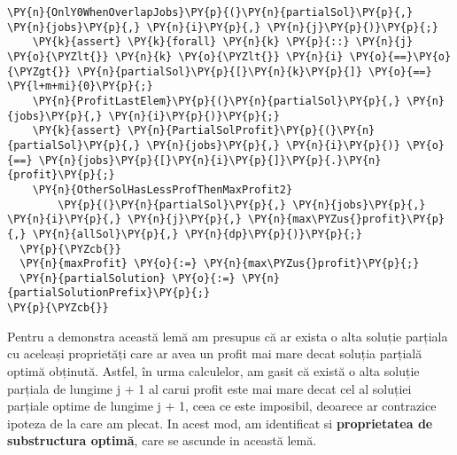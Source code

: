 \begin{Verbatim}[commandchars=\\\{\}, fontsize=\small]
    \PY{n}{OnlY0WhenOverlapJobs}\PY{p}{(}\PY{n}{partialSol}\PY{p}{,} \PY{n}{jobs}\PY{p}{,} \PY{n}{i}\PY{p}{,} \PY{n}{j}\PY{p}{)}\PY{p}{;} 
    \PY{k}{assert} \PY{k}{forall} \PY{n}{k} \PY{p}{::} \PY{n}{j} \PY{o}{\PYZlt{}} \PY{n}{k} \PY{o}{\PYZlt{}} \PY{n}{i} \PY{o}{==}\PY{o}{\PYZgt{}} \PY{n}{partialSol}\PY{p}{[}\PY{n}{k}\PY{p}{]} \PY{o}{==} \PY{l+m+mi}{0}\PY{p}{;}
    \PY{n}{ProfitLastElem}\PY{p}{(}\PY{n}{partialSol}\PY{p}{,} \PY{n}{jobs}\PY{p}{,} \PY{n}{i}\PY{p}{)}\PY{p}{;}
    \PY{k}{assert} \PY{n}{PartialSolProfit}\PY{p}{(}\PY{n}{partialSol}\PY{p}{,} \PY{n}{jobs}\PY{p}{,} \PY{n}{i}\PY{p}{)} \PY{o}{==} \PY{n}{jobs}\PY{p}{[}\PY{n}{i}\PY{p}{]}\PY{p}{.}\PY{n}{profit}\PY{p}{;}
    \PY{n}{OtherSolHasLessProfThenMaxProfit2}
        \PY{p}{(}\PY{n}{partialSol}\PY{p}{,} \PY{n}{jobs}\PY{p}{,} \PY{n}{i}\PY{p}{,} \PY{n}{j}\PY{p}{,} \PY{n}{max\PYZus{}profit}\PY{p}{,} \PY{n}{allSol}\PY{p}{,} \PY{n}{dp}\PY{p}{)}\PY{p}{;}
  \PY{p}{\PYZcb{}}
  \PY{n}{maxProfit} \PY{o}{:=} \PY{n}{max\PYZus{}profit}\PY{p}{;}
  \PY{n}{partialSolution} \PY{o}{:=} \PY{n}{partialSolutionPrefix}\PY{p}{;}
\PY{p}{\PYZcb{}}
\end{Verbatim}


Pentru a demonstra această lemă am presupus că ar exista o alta soluție parțiala cu aceleași proprietăți care ar avea un profit mai mare decat soluția parțială optimă obținută. Astfel, în urma calculelor, am gasit că există o alta soluție parțiala de lungime j $+$ 1 al carui profit este mai mare decat cel al soluției parțiale optime de lungime j $+$ 1, ceea ce este imposibil, deoarece ar contrazice ipoteza de la care am plecat. In acest mod, am identificat si \textbf{proprietatea de substructura optimă}, care se ascunde in această lemă. 


